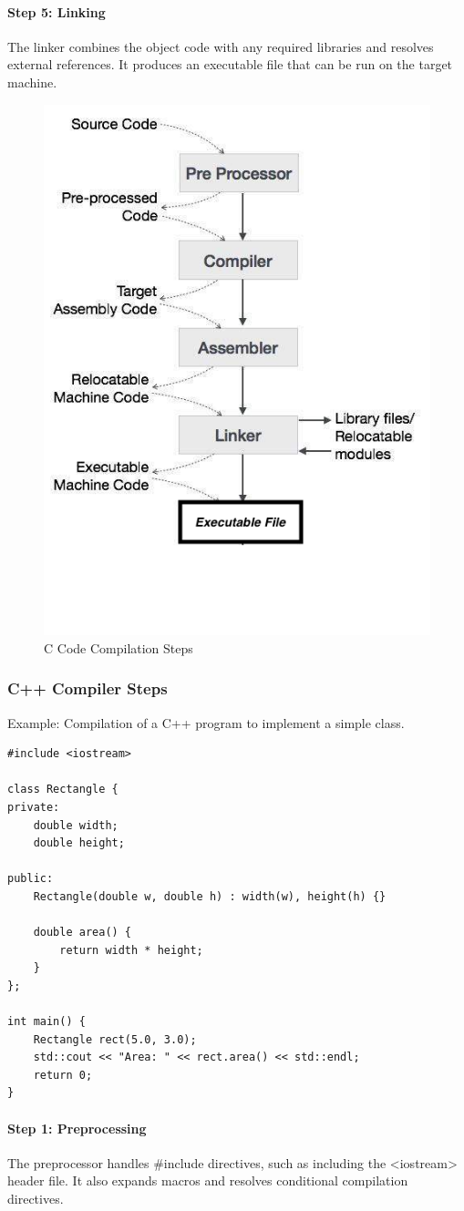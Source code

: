 \documentclass[12pt]{article}
\begin{document}
\paragraph*{Step 5: Linking}
The linker combines the object code with any required libraries and resolves external references. It produces an executable file that can be run on the target machine.

\begin{figure}[H]
    \centering
    \includegraphics[width=0.5\linewidth]{c.png}
    \caption{C Code Compilation Steps}
\end{figure}

\subsubsection*{C++ Compiler Steps}
Example: Compilation of a C++ program to implement a simple class.

\begin{lstlisting}
#include <iostream>

class Rectangle {
private:
    double width;
    double height;

public:
    Rectangle(double w, double h) : width(w), height(h) {}

    double area() {
        return width * height;
    }
};

int main() {
    Rectangle rect(5.0, 3.0);
    std::cout << "Area: " << rect.area() << std::endl;
    return 0;
}
\end{lstlisting}

\paragraph*{Step 1: Preprocessing}
The preprocessor handles \#include directives, such as including the <iostream> header file. It also expands macros and resolves conditional compilation directives.
\end{document}
